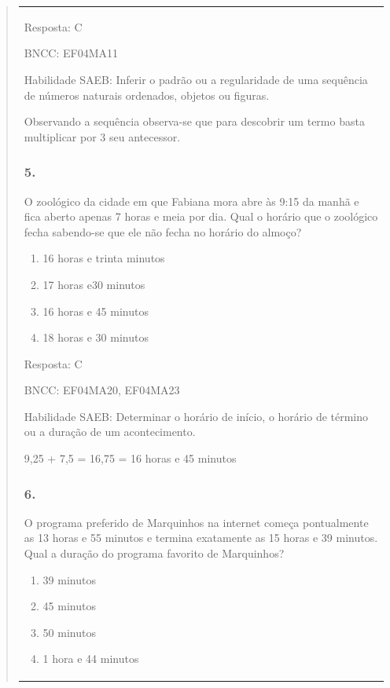 \begin{enumerate}
\begin{escolha}
\begin{enumerate}
\begin{itemize}
\begin{itemize}
\begin{escolha}
\begin{quote}
\begin{escolha}
{\begin{longtable}[]{@{}l@{}}
\begin{itemize}
Resposta: C

BNCC: EF04MA11

Habilidade SAEB: Inferir o padrão ou a regularidade de uma sequência de
números naturais ordenados, objetos ou figuras.

Observando a sequência observa-se que para descobrir um termo basta
multiplicar por 3 seu antecessor.

\subsubsection{5.}\label{section-176}

O zoológico da cidade em que Fabiana mora abre às 9:15 da manhã e fica
aberto apenas 7 horas e meia por dia. Qual o horário que o zoológico
fecha sabendo-se que ele não fecha no horário do almoço?

\begin{enumerate}
\def\labelenumi{\alph{enumi})}
\item
  16 horas e trinta minutos
\item
  17 horas e30 minutos
\item
  16 horas e 45 minutos
\item
  18 horas e 30 minutos
\end{enumerate}

Resposta: C

BNCC: EF04MA20, EF04MA23

Habilidade SAEB: Determinar o horário de início, o horário de término ou
a duração de um acontecimento.

9,25 + 7,5 = 16,75 = 16 horas e 45 minutos

\subsubsection{6.}\label{section-177}

O programa preferido de Marquinhos na internet começa pontualmente as 13
horas e 55 minutos e termina exatamente as 15 horas e 39 minutos. Qual a
duração do programa favorito de Marquinhos?

\begin{enumerate}
\def\labelenumi{\alph{enumi})}
\item
  39 minutos
\item
  45 minutos
\item
  50 minutos
\item
  1 hora e 44 minutos
\end{enumerate}


\end{itemize}
\end{longtable}}
\end{escolha}
\end{quote}
\end{escolha}
\end{itemize}
\end{itemize}
\end{enumerate}
\end{escolha}
\end{enumerate}
